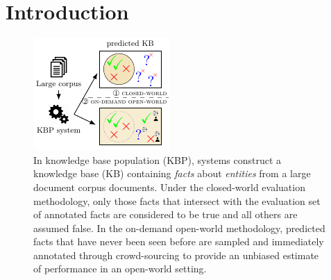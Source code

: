 \section{Introduction}
\label{sec:intro}

\begin{figure}[t]
  \includegraphics[width=\columnwidth]{figures/overview}
  \caption{\label{fig:overview}
  In knowledge base population (KBP), systems construct a knowledge base (KB) containing \textit{facts} about \textit{entities} 
  from a large document corpus documents.
  Under the closed-world evaluation methodology, only those facts that intersect with the evaluation set of annotated facts
  are considered to be true and all others are assumed false.
  In the on-demand open-world methodology, predicted facts that have never been seen before are sampled and immediately annotated through crowd-sourcing to provide an unbiased estimate of performance in an open-world setting.
  }
\end{figure}

